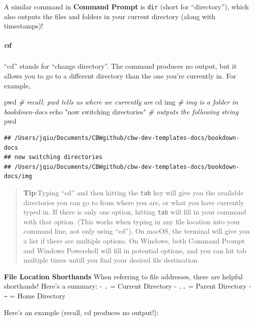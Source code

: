 \documentclass[
]{book}
\newenvironment{Shaded}{\begin{snugshade}}{\end{snugshade}}
\newcommand{\BuiltInTok}[1]{#1}
\newcommand{\CommentTok}[1]{\textcolor[rgb]{0.56,0.35,0.01}{\textit{#1}}}
\newcommand{\NormalTok}[1]{#1}
\newcommand{\StringTok}[1]{\textcolor[rgb]{0.31,0.60,0.02}{#1}}
\theoremstyle{definition}
\theoremstyle{definition}
\theoremstyle{definition}
\theoremstyle{definition}
\theoremstyle{remark}
\begin{document}
A similar command in \textbf{Command Prompt} is \texttt{dir} (short for ``directory''), which also outputs the files and folders in your current directory (along with timestamps)!

\subparagraph*{cd}\label{cd}

``cd'' stands for ``change directory''. The command produces no output, but it allows you to go to a different directory than the one you're currently in. For example,

\begin{Shaded}
\begin{Highlighting}[]
\BuiltInTok{pwd} \CommentTok{\# recall: pwd tells us where we currently are}
\BuiltInTok{cd}\NormalTok{ img }\CommentTok{\# img is a folder in bookdown{-}docs}
\BuiltInTok{echo} \StringTok{"now switching directories"} \CommentTok{\# outputs the following string}
\BuiltInTok{pwd}
\end{Highlighting}
\end{Shaded}

\begin{verbatim}
## /Users/jqiu/Documents/CBWgithub/cbw-dev-templates-docs/bookdown-docs
## now switching directories
## /Users/jqiu/Documents/CBWgithub/cbw-dev-templates-docs/bookdown-docs/img
\end{verbatim}

\begin{quote}
\textbf{Tip}:Typing ``cd'' and then hitting the \texttt{tab} key will give you the available directories you can go to from where you are, or what you have currently typed in. If there is only one option, hitting \texttt{tab} will fill in your command with that option. (This works when typing in any file location into your command line, not only using ``cd''). On macOS, the terminal will give you a list if there are multiple options. On Windows, both Command Prompt and Windows Powershell will fill in potential options, and you can hit tab multiple times untill you find your desired file destination.
\end{quote}

\textbf{File Location Shorthands} When referring to file addresses, there are helpful shorthands! Here's a summary: - \texttt{.} = Current Directory - \texttt{..} = Parent Directory - \texttt{\textasciitilde{}} = Home Directory

Here's an example (recall, cd produces no output!):
\end{document}
